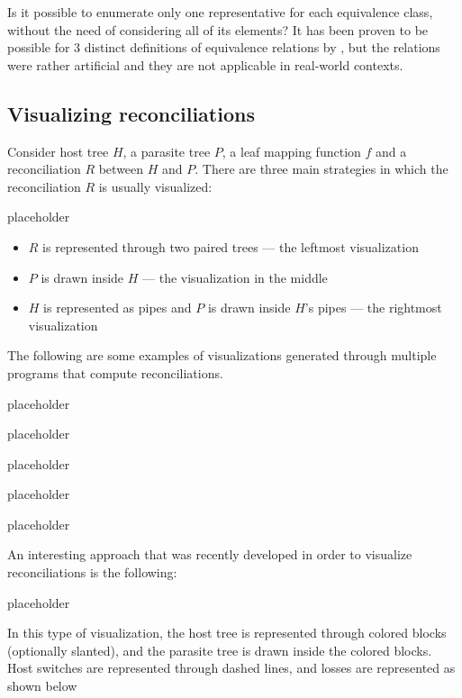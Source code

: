 \documentclass[a4paper, 12pt]{report}
\begin{document}
    Is it possible to enumerate only one representative for each equivalence class, without the need of considering all of its elements? It has been proven to be possible for 3 distinct definitions of equivalence relations by \textcite{wang}, but the relations were rather artificial and they are not applicable in real-world contexts.

    \subsection{Visualizing reconciliations}

    Consider host tree $H$, a parasite tree $P$, a leaf mapping function $f$ and a reconciliation $R$ between $H$ and $P$. There are three main strategies in which the reconciliation $R$ is usually visualized:

    placeholder 

    \begin{itemize}
        \item $R$ is represented through two paired trees --- the leftmost visualization
        \item $P$ is drawn inside $H$ --- the visualization in the middle
        \item $H$ is represented as pipes and $P$ is drawn inside $H$'s pipes --- the rightmost visualization
    \end{itemize}

    \begin{example}[Visualizations]
        The following are some examples of visualizations generated through multiple programs that compute reconciliations.

        placeholder 

        placeholder 

        placeholder 

        placeholder 

        placeholder 
    \end{example}

    An interesting approach that was recently developed in order to visualize reconciliations is the following:

    placeholder 

    In this type of visualization, the host tree is represented through colored blocks (optionally slanted), and the parasite tree is drawn inside the colored blocks. Host switches are represented through dashed lines, and losses are represented as shown below
\end{document}
